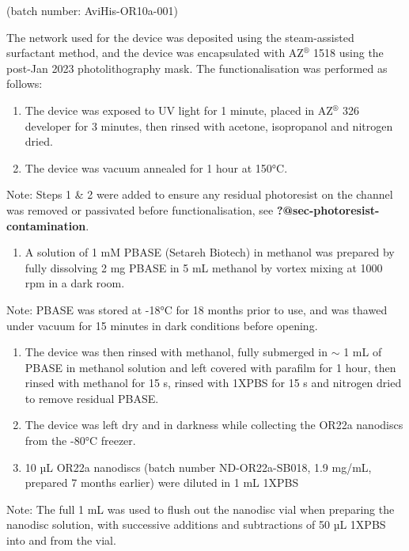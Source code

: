 \documentclass[
  a4paper,
]{scrbook}
\providecommand{\tightlist}{%
  \setlength{\itemsep}{0pt}\setlength{\parskip}{0pt}}\usepackage{longtable,booktabs,array}
\begin{document}
(batch number: AviHis-OR10a-001)

The network used for the device was deposited using the steam-assisted
surfactant method, and the device was encapsulated with AZ\(^\circledR\)
1518 using the post-Jan 2023 photolithography mask. The
functionalisation was performed as follows:

\begin{enumerate}
\def\labelenumi{\arabic{enumi}.}
\item
  The device was exposed to UV light for 1 minute, placed in
  AZ\(^\circledR\) 326 developer for 3 minutes, then rinsed with
  acetone, isopropanol and nitrogen dried.
\item
  The device was vacuum annealed for 1 hour at 150°C.
\end{enumerate}

Note: Steps 1 \& 2 were added to ensure any residual photoresist on the
channel was removed or passivated before functionalisation, see
\textbf{?@sec-photoresist-contamination}.

\begin{enumerate}
\def\labelenumi{\arabic{enumi}.}
\setcounter{enumi}{2}
\tightlist
\item
  A solution of 1 mM PBASE (Setareh Biotech) in methanol was prepared by
  fully dissolving 2 mg PBASE in 5 mL methanol by vortex mixing at 1000
  rpm in a dark room.
\end{enumerate}

Note: PBASE was stored at -18°C for 18 months prior to use, and was
thawed under vacuum for 15 minutes in dark conditions before opening.

\begin{enumerate}
\def\labelenumi{\arabic{enumi}.}
\setcounter{enumi}{3}
\item
  The device was then rinsed with methanol, fully submerged in \(\sim\)
  1 mL of PBASE in methanol solution and left covered with parafilm for
  1 hour, then rinsed with methanol for 15 s, rinsed with 1XPBS for 15 s
  and nitrogen dried to remove residual PBASE.
\item
  The device was left dry and in darkness while collecting the OR22a
  nanodiscs from the -80°C freezer.
\item
  10 µL OR22a nanodiscs (batch number ND-OR22a-SB018, 1.9 mg/mL,
  prepared 7 months earlier) were diluted in 1 mL 1XPBS
\end{enumerate}

Note: The full 1 mL was used to flush out the nanodisc vial when
preparing the nanodisc solution, with successive additions and
subtractions of 50 µL 1XPBS into and from the vial.
\end{document}
